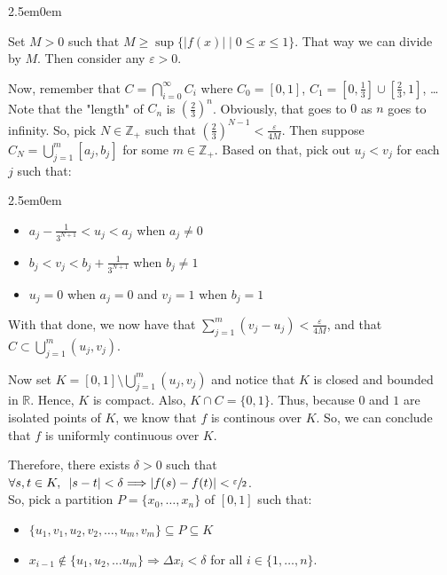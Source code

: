 \documentclass{book}
\newcommand{\pracTwo}{
   \color{Orange}%
   \fontsize{12}{14}\selectfont%
}
\newenvironment{myIndent}{%
   \begin{adjustwidth}{2.5em}{0em}%
}{%
   \end{adjustwidth}%
}
\newcommand{\myHS}{ \hspace{0.5em}}
\newcommand{\retTwo}{\hfill\bigbreak}
\begin{document}
{\begin{myIndent}\pracTwo
   Set $M > 0$ such that $M \geq \sup\{|f(x)| \mid 0 \leq x \leq 1\}$. That way we can divide\\ by $M$. Then consider any $\varepsilon > 0$.\retTwo

   Now, remember that $C = \bigcap\limits_{i=0}^\infty C_i$ where $C_0 = [0, 1]$, $C_1 = [0, \frac{1}{3}] \cup [\frac{2}{3}, 1]$, \ldots\\ [-2pt]
   Note that the "length" of $C_n$ is $\left(\frac{2}{3}\right)^n$. Obviously, that goes to $0$ as $n$ goes to\\ infinity. So, pick $N \in \mathbb{Z}_+$ such that $\left(\frac{2}{3}\right)^{N-1} < \frac{\varepsilon}{4M}$. Then suppose\\ $C_N = \bigcup\limits_{j=1}^m[a_j, b_j]$ for some $m \in \mathbb{Z}_+$. Based on that, pick out $u_j < v_j$ for each\\ $j$ such that:
   \begin{myIndent}
      \begin{itemize}
         \item $a_j - \frac{1}{3^{N+1}} < u_j < a_j$ when $a_j \neq 0$
         \item $b_j < v_j < b_j + \frac{1}{3^{N+1}}$ when $b_j \neq 1$
         \item $u_j = 0$ when $a_j = 0$ and $v_j = 1$ when $b_j = 1$\retTwo
      \end{itemize}
   \end{myIndent}

   With that done, we now have that $\sum\limits_{j=1}^m(v_j - u_j) < \frac{\varepsilon}{4M}$, and that $C \subset \bigcup\limits_{j=1}^m(u_j, v_j)$.\retTwo

   Now set $K = [0, 1] \setminus \bigcup\limits_{j=1}^m(u_j, v_j)$ and notice that $K$ is closed and bounded\\ [-2pt] in $\mathbb{R}$. Hence, $K$ is compact. Also, $K \cap C = \{0, 1\}$. Thus, because $0$ and $1$ are\\ [3pt] isolated points of $K$, we know that $f$ is continous over $K$. So, we can conclude\\ [3pt] that $f$ is uniformly continuous over $K$.\retTwo

   Therefore, there exists $\delta > 0$ such that $\forall s, t \in K,\myHS |s - t| <\delta \Longrightarrow |f(s) - f(t)| < \sfrac{\varepsilon}{2}$.\\
   So, pick a partition $P = \{x_0, \ldots, x_n\}$ of $[0, 1]$ such that:
   \begin{itemize}
      \item $\{u_1, v_1, u_2, v_2, \ldots, u_m, v_m\} \subseteq P \subseteq K$
      \item $x_{i-1} \notin \{u_1, u_2, \ldots u_m\} \Longrightarrow \Delta x_i < \delta$ for all $i \in \{1, \ldots, n\}$.\retTwo
   \end{itemize}


\end{myIndent}}
\end{document}
